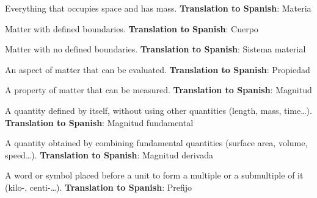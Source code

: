 \begin{vocabulary}[Matter]
    Everything that occupies space and has mass. \newline
    \textbf{Translation to Spanish}: Materia
\end{vocabulary}

\begin{vocabulary}[Body]
    Matter with defined boundaries. \newline
    \textbf{Translation to Spanish}: Cuerpo
\end{vocabulary}

\begin{vocabulary}
    Matter with no defined boundaries. \newline
    \textbf{Translation to Spanish}: Sistema material
\end{vocabulary}

\begin{vocabulary}[Property]
    An aspect of matter that can be evaluated. \newline
    \textbf{Translation to Spanish}: Propiedad
\end{vocabulary}

\begin{vocabulary}[Quantity]
    A property of matter that can be measured. \newline
    \textbf{Translation to Spanish}: Magnitud
\end{vocabulary}

\begin{vocabulary}
    A quantity defined by itself, without using other quantities (length, mass, time\ldots). \newline
    \textbf{Translation to Spanish}: Magnitud fundamental
\end{vocabulary}

\begin{vocabulary}
    A quantity obtained by combining fundamental quantities (surface area, volume, speed\ldots). \newline
    \textbf{Translation to Spanish}: Magnitud derivada
\end{vocabulary}

\begin{vocabulary}[Prefix]
    A word or symbol placed before a unit to form a multiple or a submultiple of it (kilo-, centi-\ldots). \newline
    \textbf{Translation to Spanish}: Prefijo
\end{vocabulary}

